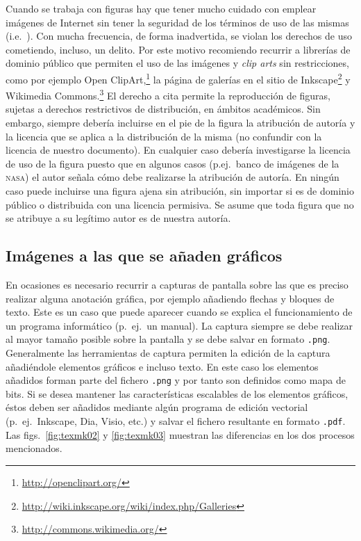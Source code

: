 \documentclass[11pt,a4paper]{article}
\begin{document}
Cuando se trabaja con figuras hay que tener mucho cuidado con emplear imágenes de Internet sin tener la seguridad de los términos de uso de las mismas (i.e.\ ). Con mucha frecuencia, de forma inadvertida, se violan los derechos de uso cometiendo, incluso, un delito. Por este motivo recomiendo recurrir a librerías de dominio público que permiten el uso de las imágenes y \emph{clip arts} sin restricciones, como por ejemplo Open ClipArt,\footnote{\url{http://openclipart.org/}} la página de galerías en el sitio de Inkscape\footnote{\url{http://wiki.inkscape.org/wiki/index.php/Galleries}} y Wikimedia Commons.\footnote{\url{http://commons.wikimedia.org/}} El derecho a cita permite la reproducción de figuras, sujetas a derechos restrictivos de distribución, en ámbitos académicos. Sin embargo, siempre debería incluirse en el pie de la figura la atribución de autoría y la licencia que se aplica a la distribución de la misma (no confundir con la licencia de nuestro documento). En cualquier caso debería investigarse la licencia de uso de la figura puesto que en algunos casos (p.ej.\ banco de imágenes de la \textsc{nasa}) el autor señala cómo debe realizarse la atribución de autoría. En ningún caso puede incluirse una figura ajena sin atribución, sin importar si es de dominio público o distribuida con una licencia permisiva. Se asume que toda figura que no se atribuye a su legítimo autor es de nuestra autoría.



\newpage
\subsection{Imágenes a las que se añaden gráficos}
En ocasiones es necesario recurrir a capturas de pantalla sobre las que es preciso realizar alguna anotación gráfica, por ejemplo añadiendo flechas y bloques de texto. Este es un caso que puede aparecer cuando se explica el funcionamiento de un programa informático (p.~ej.\ un manual). La captura siempre se debe realizar al mayor tamaño posible sobre la pantalla y se debe salvar en formato \texttt{.png}. Generalmente las herramientas de captura permiten la edición de la captura añadiéndole elementos gráficos e incluso texto. En este caso los elementos añadidos 
forman parte del fichero \texttt{.png} y por tanto son definidos como mapa de bits. Si se desea mantener las características escalables de los elementos gráficos, éstos deben ser añadidos mediante algún programa de edición vectorial (p.~ej.\ 
\textsf{Inkscape}, \textsf{Dia}, \textsf{Visio}, etc.) y salvar el fichero resultante en formato \texttt{.pdf}. Las figs.~\ref{fig:texmk02} y \ref{fig:texmk03} muestran las diferencias en los dos procesos mencionados.
\end{document}
